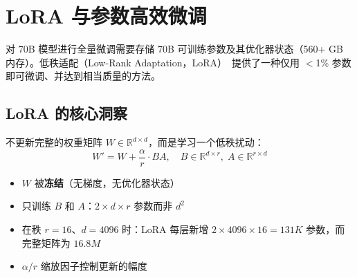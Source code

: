 \section{LoRA 与参数高效微调}
\label{lora-and-parameter-efficient-fine-tuning}

对 70B 模型进行全量微调需要存储 70B 可训练参数及其优化器状态（560+ GB 内存）。低秩适配（Low-Rank Adaptation，LoRA）~\cite{hu2021lora}提供了一种仅用 $<$1\% 参数即可微调、并达到相当质量的方法。

\subsection{LoRA 的核心洞察}
\label{the-lora-insight}

\begin{keybox}
不更新完整的权重矩阵 $W \in \mathbb{R}^{d \times d}$，而是学习一个低秩扰动：
\[
W' = W + \frac{\alpha}{r} \cdot BA, \quad B \in \mathbb{R}^{d \times r}, \; A \in \mathbb{R}^{r \times d}
\]

\begin{itemize}
  \item $W$ 被\textbf{冻结}（无梯度，无优化器状态）
  \item 只训练 $B$ 和 $A$：$2 \times d \times r$ 参数而非 $d^2$
  \item 在秩 $r=16$、$d=4096$ 时：LoRA 每层新增 $2 \times 4096 \times 16 = 131K$ 参数，而完整矩阵为 $16.8M$
  \item $\alpha/r$ 缩放因子控制更新的幅度
\end{itemize}
\end{keybox}

